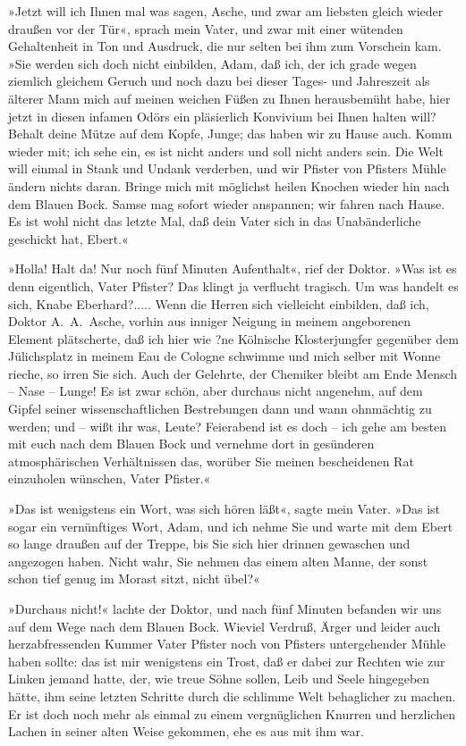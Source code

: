 »Jetzt will ich Ihnen mal was sagen, Asche, und zwar am liebsten
gleich wieder draußen vor der Tür«, sprach mein Vater, und zwar mit
einer wütenden Gehaltenheit in Ton und Ausdruck, die nur selten bei
ihm zum Vorschein kam. »Sie werden sich doch nicht einbilden, Adam,
daß ich, der ich grade wegen ziemlich gleichem Geruch und noch dazu
bei dieser Tages- und Jahreszeit als älterer Mann mich auf meinen
weichen Füßen zu Ihnen herausbemüht habe, hier jetzt in diesen
infamen Odörs ein pläsierlich Konvivium bei Ihnen halten will?
Behalt deine Mütze auf dem Kopfe, Junge; das haben wir zu Hause
auch. Komm wieder mit; ich sehe ein, es ist nicht anders und soll
nicht anders sein. Die Welt will einmal in Stank und Undank
verderben, und wir Pfister von Pfisters Mühle ändern nichts daran.
Bringe mich mit möglichst heilen Knochen wieder hin nach dem Blauen
Bock. Samse mag sofort wieder anspannen; wir fahren nach Hause. Es
ist wohl nicht das letzte Mal, daß dein Vater sich in das
Unabänderliche geschickt hat, Ebert.«

»Holla! Halt da! Nur noch fünf Minuten Aufenthalt«, rief der
Doktor. »Was ist es denn eigentlich, Vater Pfister? Das klingt ja
verflucht tragisch. Um was handelt es sich, Knabe Eberhard?.....
Wenn die Herren sich vielleicht einbilden, daß ich, Doktor
A.~A.~Asche, vorhin aus inniger Neigung in meinem angeborenen
Element plätscherte, daß ich hier wie ?ne Kölnische Klosterjungfer
gegenüber dem Jülichsplatz in meinem Eau de Cologne schwimme und
mich selber mit Wonne rieche, so irren Sie sich. Auch der Gelehrte,
der Chemiker bleibt am Ende Mensch – Nase – Lunge! Es ist zwar
schön, aber durchaus nicht angenehm, auf dem Gipfel seiner
wissenschaftlichen Bestrebungen dann und wann ohnmächtig zu werden;
und – wißt ihr was, Leute? Feierabend ist es doch – ich gehe am
besten mit euch nach dem Blauen Bock und vernehme dort in
gesünderen atmosphärischen Verhältnissen das, worüber Sie meinen
bescheidenen Rat einzuholen wünschen, Vater Pfister.«

»Das ist wenigstens ein Wort, was sich hören läßt«, sagte mein
Vater. »Das ist sogar ein vernünftiges Wort, Adam, und ich nehme
Sie und warte mit dem Ebert so lange draußen auf der Treppe, bis
Sie sich hier drinnen gewaschen und angezogen haben. Nicht wahr,
Sie nehmen das einem alten Manne, der sonst schon tief genug im
Morast sitzt, nicht übel?«

»Durchaus nicht!« lachte der Doktor, und nach fünf Minuten befanden
wir uns auf dem Wege nach dem Blauen Bock. Wieviel Verdruß, Ärger
und leider auch herzabfressenden Kummer Vater Pfister noch von
Pfisters untergehender Mühle haben sollte: das ist mir wenigstens
ein Trost, daß er dabei zur Rechten wie zur Linken jemand hatte,
der, wie treue Söhne sollen, Leib und Seele hingegeben hätte, ihm
seine letzten Schritte durch die schlimme Welt behaglicher zu
machen. Er ist doch noch mehr als einmal zu einem vergnüglichen
Knurren und herzlichen Lachen in seiner alten Weise gekommen, ehe
es aus mit ihm war.

